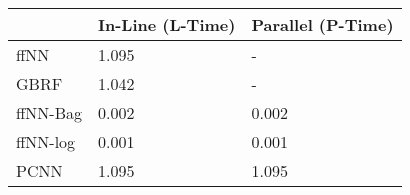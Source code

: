 \begin{tabular}{lll}
\toprule
{} & In-Line (L-Time) & Parallel (P-Time) \\
\midrule
ffNN     &            1.095 &                 - \\
GBRF     &            1.042 &                 - \\
ffNN-Bag &            0.002 &             0.002 \\
ffNN-log &            0.001 &             0.001 \\
PCNN     &            1.095 &             1.095 \\
\bottomrule
\end{tabular}
